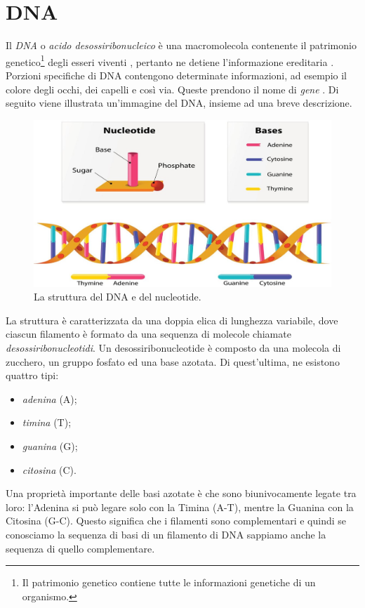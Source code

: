 \section{DNA}
Il \textit{DNA} o \textit{acido desossiribonucleico} è una macromolecola contenente il patrimonio genetico\footnote{Il patrimonio genetico contiene tutte le informazioni genetiche di un organismo.} degli esseri viventi \cite{campbellBiology}, pertanto ne detiene l'informazione ereditaria \cite{BiologySolomon}.
\newline
Porzioni specifiche di DNA contengono determinate informazioni, ad esempio il colore degli occhi, dei capelli e così via. Queste prendono il nome di \textit{gene} \cite{MolecularCellBiology}.
\newline
Di seguito viene illustrata un'immagine del DNA, insieme ad una breve descrizione.
\newline
\begin{figure}[h!]
	\includegraphics[width=\linewidth]{DNAStructure.jpg}
 	\caption{La struttura del DNA e del nucleotide.}
  	\label{fig:DnaAndNucleotideStructure}
\end{figure}
\newline
La struttura è caratterizzata da una doppia elica di lunghezza variabile, dove ciascun filamento è formato da una sequenza di molecole chiamate \textit{desossiribonucleotidi}.
\newline
Un desossiribonucleotide è composto da una molecola di zucchero, un gruppo fosfato ed una base azotata. Di quest'ultima, ne esistono quattro tipi:
\begin{itemize}
	\item \textit{adenina} (A);
	\item \textit{timina} (T);
	\item \textit{guanina} (G);
	\item \textit{citosina} (C).
\end{itemize}
Una proprietà importante delle basi azotate è che sono biunivocamente legate tra loro: l'Adenina si può legare solo con la Timina (A-T), mentre la Guanina con la Citosina (G-C). Questo significa che i filamenti sono complementari e quindi se conosciamo la sequenza di basi di un filamento di DNA sappiamo anche la sequenza di quello complementare.

